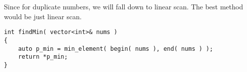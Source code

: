 Since for duplicate numbers, we will fall down to linear scan. The best method would be just linear scan.

\setcounter{lstlisting}{0}
\begin{lstlisting}[style=customc, caption={Linear Scan}]
int findMin( vector<int>& nums )
{
    auto p_min = min_element( begin( nums ), end( nums ) );
    return *p_min;
}
\end{lstlisting}
